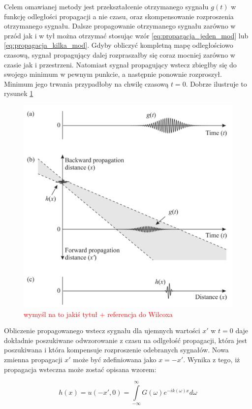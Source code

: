 Celem omawianej metody jest przekształcenie otrzymanego sygnału $g(t)$ w funkcję odległości propagacji a nie czasu, oraz skompensowanie rozproszenia otrzymanego sygnału. Dalsze propagowanie otrzymanego sygnału zarówno w przód jak i w tył można otrzymać stosując wzór \ref{eq:propagacja_jeden_mod} lub \ref{eq:propagacja_kilka_mod}. Gdyby obliczyć kompletną mapę odległościowo czasową, sygnał propagujący dalej rozpraszałby się coraz mocniej zarówno w czasie jak i przestrzeni. Natomiast sygnał propagujący wstecz zbiegłby się do swojego minimum w pewnym punkcie, a następnie ponownie rozproszył. Minimum jego trwania przypadłoby na chwilę czasową $t=0$. Dobrze ilustruje to rysunek \ref{fig:Wilcox_propaguje}
\begin{figure}[h]
\centering
\includegraphics[width=14cm]{Zdjecia/4/Wilcox_zasada_dzial}
\caption{\textcolor{red}{wymyśl na to jakiś tytuł + referencja do Wilcoxa}}
\label{fig:Wilcox_propaguje}
\end{figure}
Obliczenie propagowanego wstecz sygnału dla ujemnych wartości $x'$ w $t=0$ daje dokładnie poszukiwane odwzorowanie z czasu na odlgełość propagacji, która jest poszukiwana i która kompensuje rozproszenie odebranych sygnałów. Nowa zmienna propagacji $x'$ może być zdefiniowana jako $x=-x'$. Wynika z tego, iż propagacja wsteczna może zostać opisana wzorem:

\begin{equation}
h(x) = u(-x',0) = \int \limits_{-\infty}^{\infty}G(\omega)e^{-ik(\omega)x}d\omega \label{eq:wsteczna propagacja}
\end{equation}

